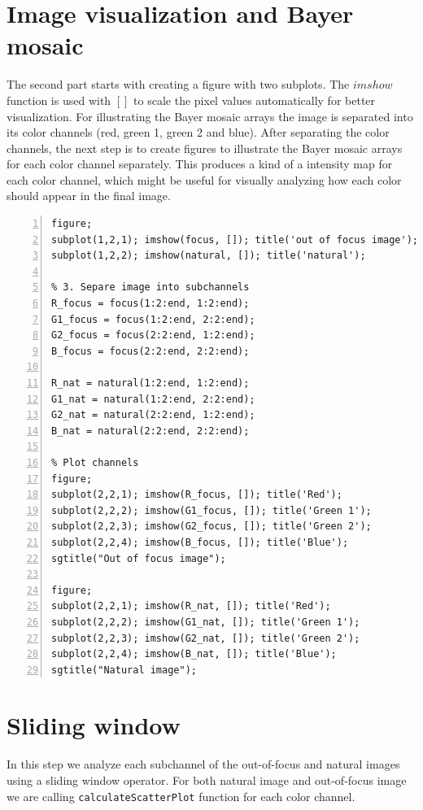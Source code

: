 \documentclass[12pt,a4paper,english
]{tunithesis}
\begin{document}
\section{Image visualization and Bayer mosaic}
The second part starts with creating a figure with two subplots. The $imshow$ function is used with $[]$ to scale the pixel values automatically for better visualization. For illustrating the Bayer mosaic arrays the image is separated into its color channels (red, green 1, green 2 and blue). After separating the color channels, the next step is to create figures to illustrate the Bayer mosaic arrays for each color channel separately. This produces a kind of a intensity map for each color channel, which might be useful for visually analyzing how each color should appear in the final image.
\begin{lstlisting}[style=Matlab-editor, numbers=left, basicstyle=\footnotesize]
% 2. Visualize Images, Bayer mosaic array
figure;
subplot(1,2,1); imshow(focus, []); title('out of focus image');
subplot(1,2,2); imshow(natural, []); title('natural');

% 3. Separe image into subchannels
R_focus = focus(1:2:end, 1:2:end);
G1_focus = focus(1:2:end, 2:2:end);
G2_focus = focus(2:2:end, 1:2:end);
B_focus = focus(2:2:end, 2:2:end);

R_nat = natural(1:2:end, 1:2:end);
G1_nat = natural(1:2:end, 2:2:end);
G2_nat = natural(2:2:end, 1:2:end);
B_nat = natural(2:2:end, 2:2:end);

% Plot channels
figure;
subplot(2,2,1); imshow(R_focus, []); title('Red');
subplot(2,2,2); imshow(G1_focus, []); title('Green 1');
subplot(2,2,3); imshow(G2_focus, []); title('Green 2');
subplot(2,2,4); imshow(B_focus, []); title('Blue');
sgtitle("Out of focus image");

figure;
subplot(2,2,1); imshow(R_nat, []); title('Red');
subplot(2,2,2); imshow(G1_nat, []); title('Green 1');
subplot(2,2,3); imshow(G2_nat, []); title('Green 2');
subplot(2,2,4); imshow(B_nat, []); title('Blue');
sgtitle("Natural image");
\end{lstlisting}
\section{Sliding window}
In this step we analyze each subchannel of the out-of-focus and natural images using a sliding window operator. For both natural image and out-of-focus image we are calling \texttt{calculateScatterPlot} function for each color channel.
\end{document}
